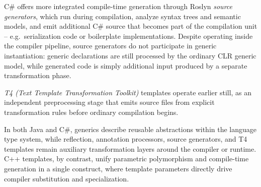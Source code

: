 \documentclass[11pt]{report}
\begin{document}
C\# offers more integrated compile-time generation through Roslyn
\emph{source generators}, which run during compilation, analyze syntax
trees and semantic models, and emit additional C\# source that becomes
part of the compilation unit -- e.g.\ serialization code or boilerplate
implementations. Despite operating inside the compiler pipeline, source
generators do not participate in generic instantiation: generic
declarations are still processed by the ordinary CLR generic model, while
generated code is simply additional input produced by a separate
transformation phase.

\emph{T4 (Text Template Transformation Toolkit)} templates operate earlier
still, as an independent preprocessing stage that emits source files from
explicit transformation rules before ordinary compilation begins.

In both Java and C\#, generics describe reusable abstractions within the
language type system, while reflection, annotation processors, source
generators, and T4 templates remain auxiliary transformation layers around
the compiler or runtime. C++ templates, by contrast, unify parametric
polymorphism and compile-time generation in a single construct, where
template parameters directly drive compiler substitution and
specialization.

\end{document}
